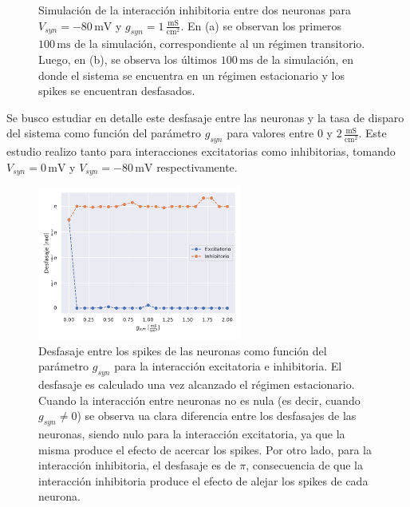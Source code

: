 \begin{figure}[h!]
\begin{subfigure}[b]{0.48\textwidth}
        \caption{}
        \label{Simulacion_Inhibitorio_final}
    \end{subfigure}
    \caption{Simulación de la interacción inhibitoria entre dos neuronas para $V_{syn}=-80\,\text{mV}$ y $g_{syn}=1\,\frac{\text{mS}}{\text{cm}^2}$. En (a) se observan los primeros $100\,\text{ms}$ de la simulación, correspondiente al un régimen transitorio. Luego, en (b), se observa los últimos $100\,\text{ms}$ de la simulación, en donde el sistema se encuentra en un régimen estacionario y los spikes se encuentran desfasados.}
    \label{ej01:Simulacion_Inhibitorio}
\end{figure}


Se busco estudiar en detalle este desfasaje entre las neuronas y la tasa de disparo del sistema como función del parámetro $g_{syn}$ para valores entre $0$ y $2\,\frac{\text{mS}}{\text{cm}^2}$. Este estudio realizo tanto para interacciones excitatorias como inhibitorias, tomando $V_{syn}=0\,\text{mV}$ y $V_{syn}=-80\,\text{mV}$ respectivamente.


\begin{figure}[h!]
    \centering
    \includegraphics[width=0.6\textwidth]{Desfasaje.pdf}
    \caption{Desfasaje entre los spikes de las neuronas como función del parámetro $g_{syn}$ para la interacción excitatoria e inhibitoria. El desfasaje es calculado una vez alcanzado el régimen estacionario. Cuando la interacción entre neuronas no es nula (es decir, cuando $g_{syn} \neq 0$) se observa ua clara diferencia entre los desfasajes de las neuronas, siendo nulo para la interacción excitatoria, ya que la misma produce el efecto de acercar los spikes. Por otro lado, para la interacción inhibitoria, el desfasaje es de $\pi$, consecuencia de que la interacción inhibitoria produce el efecto de alejar los spikes de cada neurona.}
    \label{ej01:Desfasaje}
\end{figure}

